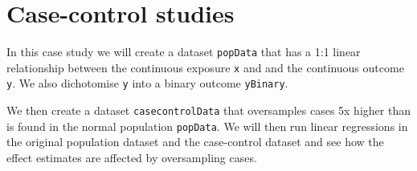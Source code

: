 \documentclass[]{book}
\newenvironment{Shaded}{\begin{snugshade}}{\end{snugshade}}
\newcommand{\KeywordTok}[1]{\textcolor[rgb]{0.13,0.29,0.53}{\textbf{{#1}}}}
\newcommand{\DataTypeTok}[1]{\textcolor[rgb]{0.13,0.29,0.53}{{#1}}}
\newcommand{\DecValTok}[1]{\textcolor[rgb]{0.00,0.00,0.81}{{#1}}}
\newcommand{\StringTok}[1]{\textcolor[rgb]{0.31,0.60,0.02}{{#1}}}
\newcommand{\NormalTok}[1]{{#1}}
\theoremstyle{definition}
\theoremstyle{definition}
\theoremstyle{remark}
\begin{document}
\begin{Shaded}
\end{Shaded}

\section{Case-control studies}\label{case-control-studies}

In this case study we will create a dataset \texttt{popData} that has a
1:1 linear relationship between the continuous exposure \texttt{x} and
and the continuous outcome \texttt{y}. We also dichotomise \texttt{y}
into a binary outcome \texttt{yBinary}.

We then create a dataset \texttt{casecontrolData} that oversamples cases
5x higher than is found in the normal population \texttt{popData}. We
will then run linear regressions in the original population dataset and
the case-control dataset and see how the effect estimates are affected
by oversampling cases.
\end{document}
